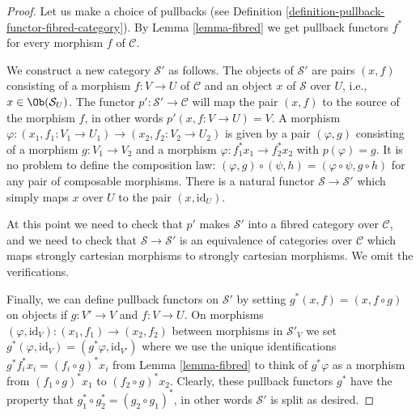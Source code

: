 \begin{proof}
Let us make a choice of pullbacks (see
Definition \ref{definition-pullback-functor-fibred-category}).
By Lemma \ref{lemma-fibred} we get pullback functors $f^*$ for
every morphism $f$ of $\mathcal{C}$.

\medskip\noindent
We construct a new category $\mathcal{S}'$ as follows.
The objects of $\mathcal{S}'$ are pairs $(x, f)$
consisting of a morphism $f : V \to U$ of $\mathcal{C}$
and an object $x$ of $\mathcal{S}$ over $U$, i.e.,
$x\in \Ob(\mathcal{S}_U)$. The functor
$p' : \mathcal{S}' \to \mathcal{C}$ will map the pair $(x, f)$ to the source
of the morphism $f$, in other words $p'(x, f : V\to U) = V$. A morphism
$\varphi : (x_1, f_1: V_1 \to U_1) \to (x_2, f_2 : V_2 \to U_2)$ is given by a
pair $(\varphi, g)$ consisting of a morphism $g : V_1 \to V_2$ and a morphism
$\varphi : f_1^\ast x_1 \to f_2^\ast x_2$ with $p(\varphi) = g$. It is no
problem to define the composition law: $(\varphi, g) \circ (\psi, h) =
(\varphi \circ \psi, g\circ h)$ for any pair of composable morphisms.
There is a natural functor $\mathcal{S} \to \mathcal{S}'$ which simply maps
$x$ over $U$ to the pair $(x, \text{id}_U)$.

\medskip\noindent
At this point we need to check that $p'$ makes $\mathcal{S}'$ into a
fibred category over $\mathcal{C}$, and we need to check that
$\mathcal{S} \to \mathcal{S}'$ is an equivalence of categories over
$\mathcal{C}$ which maps strongly cartesian morphisms to strongly
cartesian morphisms. We omit the verifications.

\medskip\noindent
Finally, we can define pullback functors on $\mathcal{S}'$
by setting $g^\ast(x, f) = (x, f \circ g)$ on objects if
$g : V' \to V$ and $f : V \to U$. On morphisms
$(\varphi, \text{id}_V) : (x_1, f_1) \to (x_2, f_2)$
between morphisms in $\mathcal{S}'_V$ we set $g^\ast(\varphi, \text{id}_V) =
(g^\ast\varphi, \text{id}_{V'})$ where we use the unique identifications
$g^\ast f_i^\ast x_i = (f_i \circ g)^\ast x_i$ from Lemma
\ref{lemma-fibred} to think of $g^\ast\varphi$ as a morphism from
$(f_1 \circ g)^\ast x_1$ to $(f_2 \circ g)^\ast x_2$. Clearly, these pullback
functors $g^\ast$ have the property that
$g_1^\ast \circ g_2^\ast = (g_2\circ g_1)^\ast$, in other words $\mathcal{S}'$
is split as desired.
\end{proof}


















